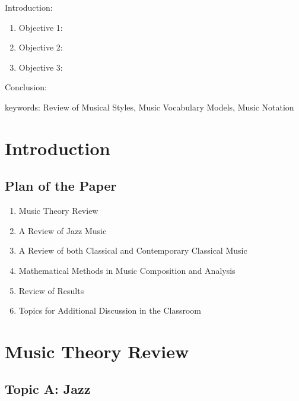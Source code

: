 


\twocolumn
\scriptsize
\begin{frontmatter}
		\title{}
		\author{}
		\address{The Mathematical Learning Space}
\end{frontmatter}	

Introduction:
\begin{enumerate}
\item Objective 1:
\item Objective 2:
\item Objective 3:
\end{enumerate}
Conclusion:

keywords: Review of Musical Styles, Music Vocabulary Models, Music Notation

\section{Introduction}

\subsection{Plan of the Paper}

\begin{enumerate}
\item Music Theory  Review
\item A Review of Jazz Music
\item A Review of both Classical and Contemporary Classical Music
\item Mathematical Methods in Music Composition and Analysis
\item Review of Results
\item Topics for Additional Discussion in the Classroom
\end{enumerate}

\section{Music Theory Review}

\subsection{Topic A: Jazz}

